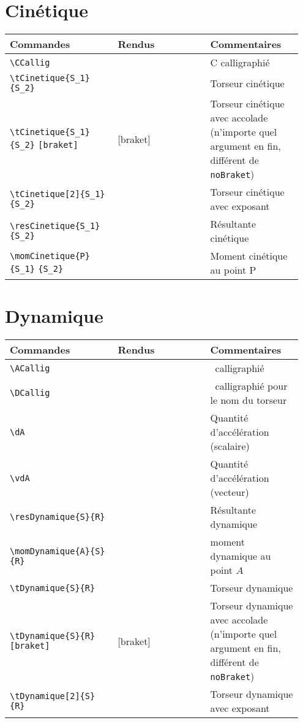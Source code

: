 \documentclass[a4paper,10pt]{article}
\begin{document}
	\section{Cinétique}
	\noindent
	\begin{tabular}{|p{0.35\linewidth}|p{0.3\linewidth}|p{0.3\linewidth}|}
		\hline
			\textbf{Commandes}&\textbf{Rendus}&\textbf{Commentaires}
		\\\hline\hline
			\verb!\CCallig!			&	\CCallig			&	C calligraphié
		\\\hline
			\verb!\tCinetique{S_1}{S_2}!			&	\tCinetique{S_1}{S_2}			&	Torseur cinétique
		\\\hline
			\verb!\tCinetique{S_1}{S_2}! \verb![braket]!			&	\tCinetique{S_1}{S_2}[braket]			&	Torseur cinétique avec accolade (n'importe quel argument en fin, différent de \verb!noBraket!)
		\\\hline
			\verb!\tCinetique[2]{S_1}{S_2}!			&	\tCinetique[2]{S_1}{S_2}			&	Torseur cinétique avec exposant
		\\\hline
			\verb!\resCinetique{S_1}{S_2}!			&	\resCinetique{S_1}{S_2}			&	Résultante cinétique
		\\\hline
			\verb!\momCinetique{P}{S_1}! \verb!{S_2}!			&	\momCinetique{P}{S_1}{S_2}			&	Moment cinétique au point P
		\\\hline
	\end{tabular}

	\section{Dynamique}
    \noindent
	\begin{tabular}{|p{0.35\linewidth}|p{0.3\linewidth}|p{0.3\linewidth}|}
		\hline
			\textbf{Commandes}&\textbf{Rendus}&\textbf{Commentaires}
		\\\hline\hline
			\verb!\ACallig!			&	\ACallig			&	\ACallig\ calligraphié
		\\\hline
			\verb!\DCallig!			&	\DCallig			&	\DCallig\ calligraphié pour le nom du torseur
		\\\hline
			\verb!\dA!			&	\dA			&	Quantité d'accélération (scalaire)
		\\\hline
			\verb!\vdA!			&	\vdA			&	Quantité d'accélération (vecteur)
		\\\hline
			\verb!\resDynamique{S}{R}!			&	\resDynamique{S}{R}			&	Résultante dynamique
		\\\hline
			\verb!\momDynamique{A}{S}{R}!			&	\momDynamique{A}{S}{R}			&	moment dynamique au point $A$
		\\\hline
			\verb!\tDynamique{S}{R}!			&	\tDynamique{S}{R}			&	Torseur dynamique
		\\\hline
			\verb!\tDynamique{S}{R}! \verb![braket]!			&	\tDynamique{S}{R}[braket]			&	Torseur dynamique avec accolade (n'importe quel argument en fin, différent de \verb!noBraket!)
		\\\hline
			\verb!\tDynamique[2]{S}{R}!			&	\tDynamique[2]{S}{R}			&	Torseur dynamique avec exposant
		\\\hline
	\end{tabular}
\end{document}
